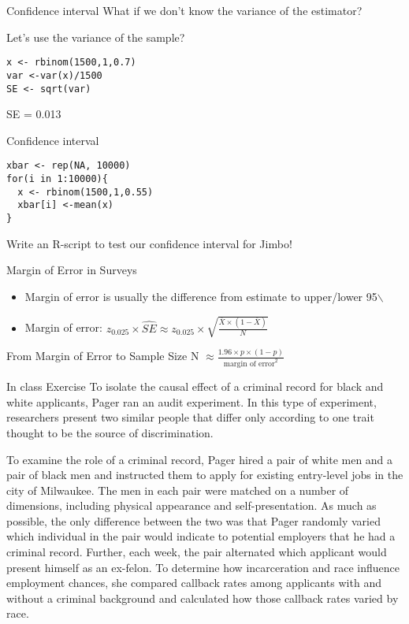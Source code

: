 \documentclass[presentation]{beamer}
\begin{document}
\begin{frame}[fragile,label={sec:org43f8d56}]{Confidence interval}
 What if we don't know the variance of the estimator?

Let's use the variance of the sample?

\begin{verbatim}
x <- rbinom(1500,1,0.7)
var <-var(x)/1500
SE <- sqrt(var)
\end{verbatim}

SE = 0.013
\end{frame}


\begin{frame}[fragile,label={sec:org17ffde3}]{Confidence interval}
 \begin{verbatim}
xbar <- rep(NA, 10000)
for(i in 1:10000){
  x <- rbinom(1500,1,0.55)
  xbar[i] <-mean(x)
}
\end{verbatim}

Write an R-script to test our confidence interval for Jimbo!
\end{frame}


\begin{frame}[label={sec:orgaa54d71}]{Margin of Error in Surveys}
\begin{itemize}
\item Margin of error is usually the difference from estimate to upper/lower 95$\backslash$%

\item Margin of error: \(z_{0.025} \times \hat{SE} \approx  z_{0.025} \times \sqrt{\frac{\overline{X} \times (1-\overline{X})}{N}}\)
\end{itemize}
\end{frame}


\begin{frame}[label={sec:org15729af}]{From Margin of Error to Sample Size}
N \(\approx \frac{1.96 \times p \times (1-p)}{\text{margin of error}^{2}}\)
\end{frame}


\begin{frame}[shrink=25,label={sec:orge18fe9f}]{In class Exercise}
To isolate the causal effect of a criminal record for black and white applicants, Pager ran an audit experiment. In this type of experiment, researchers present two similar people that differ only according to one trait thought to be the source of discrimination.

To examine the role of a criminal record, Pager hired a pair of white men and a pair of black men and instructed them to apply for existing entry-level jobs in the city of Milwaukee. The men in each pair were matched on a number of dimensions, including physical appearance and self-presentation. As much as possible, the only difference between the two was that Pager randomly varied which individual in the pair would indicate to potential employers that he had a criminal record. Further, each week, the pair alternated which applicant would present himself as an ex-felon. To determine how incarceration and race influence employment chances, she compared callback rates among applicants with and without a criminal background and calculated how those callback rates varied by race.
\end{frame}
\end{document}
